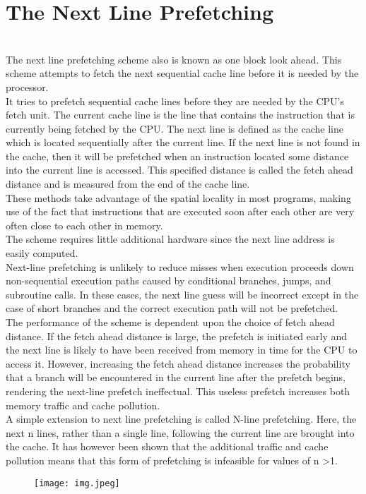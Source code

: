 \documentclass{article}
\begin{document}
\section{The Next Line Prefetching}
\\The next line prefetching scheme also is known as one block look ahead. This scheme attempts to fetch the next sequential cache line before it is needed by the processor.
\\It tries to prefetch sequential cache lines before they are needed by the CPU’s fetch unit. The current cache line is the line that contains the instruction that is currently being fetched by the CPU. The next line is defined as the cache line which is located sequentially after the current line. If the next line is not found in the cache, then it will be prefetched when an instruction located some distance into the current line is accessed. This specified distance is called the fetch ahead distance and is measured from the end of the cache line.
\\These methods take advantage of the spatial locality in most programs, making use of the fact that instructions that are executed soon after each other are very often close to each other in memory.
\\The scheme requires little additional hardware since the next line address is easily computed.
\\Next-line prefetching is unlikely to reduce misses when execution proceeds down non-sequential execution paths caused by conditional branches, jumps, and subroutine calls. In these cases, the next line guess will be incorrect except in the case of short branches and the correct execution path will not be prefetched.
\\The performance of the scheme is dependent upon the choice of fetch ahead distance. If the fetch ahead distance is large, the prefetch is initiated early and the next line is likely to have been received from memory in time for the CPU to access it. However, increasing the fetch ahead distance increases the probability that a branch will be encountered in the current line after the prefetch begins, rendering the next-line prefetch ineffectual. This useless prefetch increases both memory traffic and cache pollution.
\\A simple extension to next line prefetching is called N-line prefetching. Here, the next n lines, rather than a single line, following the current line are brought into the cache. It has however been shown that the additional traffic and cache pollution means that this form of prefetching is infeasible for values of n \textgreater 1.
\begin{figure}[htp]
    \centering
    \texttt{[image: img.jpeg]}
    \label{fig:galaxy}
\end{figure}
\end{document}
